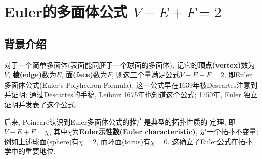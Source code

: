 \documentclass[main]{subfiles}
\begin{document}
\renewcommand{\filename}{subfile7}%
{} 
\section{Euler的多面体公式 $V-E+F=2$}
\subsection{背景介绍}
对于一个简单多面体(表面能同胚于一个球面的多面体), 记它的\textbf{顶点(vertex)}数为$V$, \textbf{棱(edge)}数为$E$, 
\textbf{面(face)}数为$F$, 则这三个量满足公式$V-E+F=2$, 即Euler多面体公式(Euler's Polyhedron Formula). 这一公式早在1639年被Descartes注意到并证明;
通过Descartes的手稿, Leibniz 1675年也知道这个公式; 1750年, Euler 独立证明并发表了这个公式.


后来, Poincaré认识到Euler多面体公式的推广是典型的拓扑性质的
定理, 即$V-E+F=\chi$, 其中$\chi$为\textbf{Euler示性数(Euler characteristic)}, 是一个拓扑不变量; 例如上述球面(sphere)有$\chi=2$, 而环面(torus)有$\chi=0$.
这确立了Euler公式在拓扑学中的重要地位. 
\end{document}
